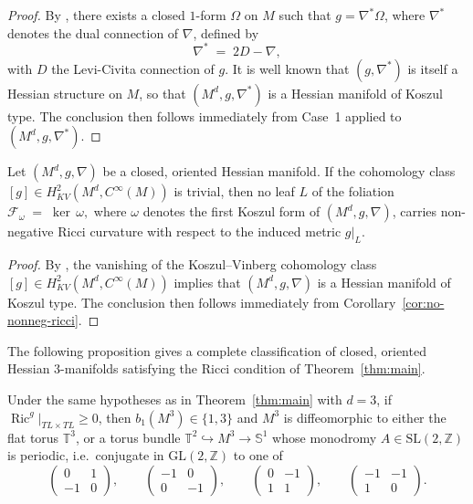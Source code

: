 \begin{proof}
\medskip


By \citep[Theorem~5.8]{Gnandi2026}, there exists a closed $1$-form $\Omega$
on $M$ such that $g = \nabla^*\Omega$, where $\nabla^*$ denotes the dual
connection of $\nabla$, defined by
\[
\nabla^* \;=\; 2D - \nabla,
\]
with $D$ the Levi-Civita connection of $g$. It is well known that
$(g, \nabla^*)$ is itself a Hessian structure on $M$, so that
$(M^d, g, \nabla^*)$ is a Hessian manifold of Koszul type. The conclusion
then follows immediately from Case~1 applied to $(M^d, g, \nabla^*)$.
\end{proof}

\begin{cor}\label{cor:noo-nonneg-ricci}
Let $(M^d, g, \nabla)$ be a closed, oriented Hessian manifold. 
If the cohomology class $[g] \in H^2_{KV}(M^d, C^{\infty}(M))$ 
is trivial, then no leaf $L$ of the foliation
$\mathcal{F}_\omega \;=\; \ker\,\omega,$
where $\omega$ denotes the first Koszul form of $(M^d, g, \nabla)$,
carries non-negative Ricci curvature with respect to the induced 
metric $g|_L$.
\end{cor}

\begin{proof}
By \citep[Corollary~2]{boyom2024}, the vanishing of the 
Koszul--Vinberg cohomology class 
$[g] \in H^2_{KV}(M^d, C^{\infty}(M))$ implies that 
$(M^d, g, \nabla)$ is a Hessian manifold of Koszul type. 
The conclusion then follows immediately from 
Corollary~\ref{cor:no-nonneg-ricci}.
\end{proof}

The following proposition gives a complete classification of closed, 
oriented Hessian $3$-manifolds satisfying the Ricci condition 
of Theorem~\ref{thm:main}.

\begin{prop}\label{pro:dim3}
Under the same hypotheses as in Theorem~\ref{thm:main} with $d = 3$,
if $\operatorname{Ric}^g|_{TL \times TL} \geq 0$, then 
$b_1(M^3) \in \{1, 3\}$ and $M^3$ is diffeomorphic to either the 
flat torus $\mathbb{T}^3$, or a torus bundle 
$\mathbb{T}^2 \hookrightarrow M^3 \to \mathbb{S}^1$ whose monodromy 
$A \in \mathrm{SL}(2,\mathbb{Z})$ is periodic, i.e.\ conjugate in 
$\mathrm{GL}(2,\mathbb{Z})$ to one of
\[
\begin{pmatrix} 0 & 1 \\ -1 & 0 \end{pmatrix}, \qquad
\begin{pmatrix} -1 & 0 \\ 0 & -1 \end{pmatrix}, \qquad
\begin{pmatrix} 0 & -1 \\ 1 & 1 \end{pmatrix}, \qquad
\begin{pmatrix} -1 & -1 \\ 1 & 0 \end{pmatrix}.
\]
\end{prop}

